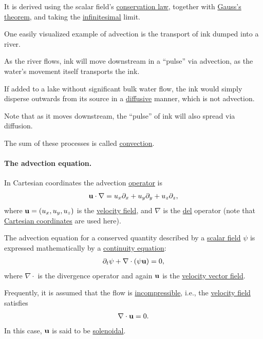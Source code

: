 \documentclass{article}
\begin{document}
It is derived using the scalar field's \href{https://en.wikipedia.org/wiki/Conservation_law}{conservation law}, together with \href{https://en.wikipedia.org/wiki/Gauss's_theorem}{Gauss's theorem}, and taking the \href{https://en.wikipedia.org/wiki/Infinitesimal}{infinitesimal} limit.

%
One easily visualized example of advection is the transport of ink dumped into a river.

As the river flows, ink will move downstream in a ``pulse'' via advection, as the water's movement itself transports the ink.

If added to a lake without significant bulk water flow, the ink would simply disperse outwards from its source in a \href{https://en.wikipedia.org/wiki/Diffusion}{diffusive} manner, which is not advection.

Note that as it moves downstream, the ``pulse'' of ink will also spread via diffusion.

The sum of these processes is called \href{https://en.wikipedia.org/wiki/Convection}{convection}.

\paragraph{The advection equation.} In Cartesian coordinates the advection \href{https://en.wikipedia.org/wiki/Operator_(mathematics)}{operator} is
\begin{align*}
	{\bf u}\cdot\nabla = u_x\partial_x + u_y\partial_y + u_z\partial_z,
\end{align*}
where ${\bf u} = (u_x,u_y,u_z)$ is the \href{https://en.wikipedia.org/wiki/Velocity_field}{velocity field}, and $\nabla$ is the \href{https://en.wikipedia.org/wiki/Del}{del} operator (note that \href{https://en.wikipedia.org/wiki/Cartesian_coordinate_system}{Cartesian coordinates} are used here).

%
The advection equation for a conserved quantity described by a \href{https://en.wikipedia.org/wiki/Scalar_field}{scalar field} $\psi$ is expressed mathematically by a \href{https://en.wikipedia.org/wiki/Continuity_equation}{continuity equation}:
\begin{align*}
	\partial_t\psi + \nabla\cdot\left(\psi{\bf u}\right) = 0,
\end{align*}
where $\nabla\cdot$  is the divergence operator and again ${\bf u}$ is the \href{https://en.wikipedia.org/wiki/Velocity_field}{velocity vector field}.

Frequently, it is assumed that the flow is \href{https://en.wikipedia.org/wiki/Incompressible_flow}{incompressible}, i.e., the \href{https://en.wikipedia.org/wiki/Velocity_field}{velocity field} satisfies 
\begin{align*}
	\nabla\cdot{\bf u} = 0.
\end{align*}
In this case, ${\bf u}$ is said to be \href{https://en.wikipedia.org/wiki/Solenoidal}{solenoidal}.
\end{document}
